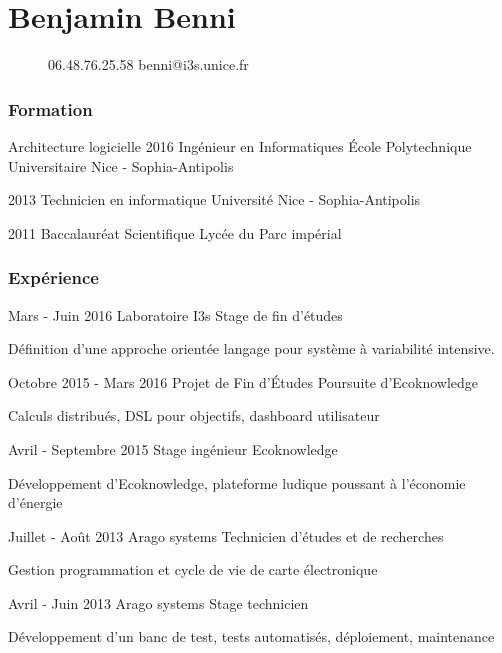 \documentclass{tccv}
\begin{document}
\part{Benjamin Benni}
\begin{figure}[t]
    {06.48.76.25.58}
    {benni@i3s.unice.fr}
\end{figure}


\section{Formation}

\begin{yearlist}

\item[Architecture logicielle]{2016}
     {Ing\'enieur en Informatiques}
     {\'Ecole Polytechnique Universitaire Nice - Sophia-Antipolis}

\item{2013}
     {Technicien en informatique}
     {Universit\'e Nice - Sophia-Antipolis}

\item{2011}
     {Baccalaur\'eat Scientifique}
     {Lyc\'ee du Parc imp\'erial}

\end{yearlist}

\section{Exp\'erience}

\begin{eventlist}

\item{Mars - Juin 2016}
     {Laboratoire I3s}
     {Stage de fin d'\'etudes}

	D\'efinition d'une approche orient\'ee langage pour syst\`eme \`a variabilit\'e intensive.

\item{Octobre 2015 - Mars 2016}
     {Projet de Fin d'\'Etudes}
     {Poursuite d'Ecoknowledge}

Calculs distribu\'es, DSL pour objectifs, dashboard utilisateur

\item{Avril - Septembre 2015}
     {Stage ing\'enieur}
     {Ecoknowledge}
     
     D\'eveloppement d'Ecoknowledge, plateforme ludique poussant \`a l'\'economie d'\'energie

\item{Juillet - Ao\^ut 2013}
     {Arago systems}
     {Technicien d'\'etudes et de recherches}
     
     Gestion programmation et cycle de vie de carte \'electronique
     
 \item{Avril - Juin 2013}
     {Arago systems}
     {Stage technicien}
     
     D\'eveloppement d'un banc de test, tests automatis\'es, d\'eploiement, maintenance
     
\end{eventlist}
\end{document}
